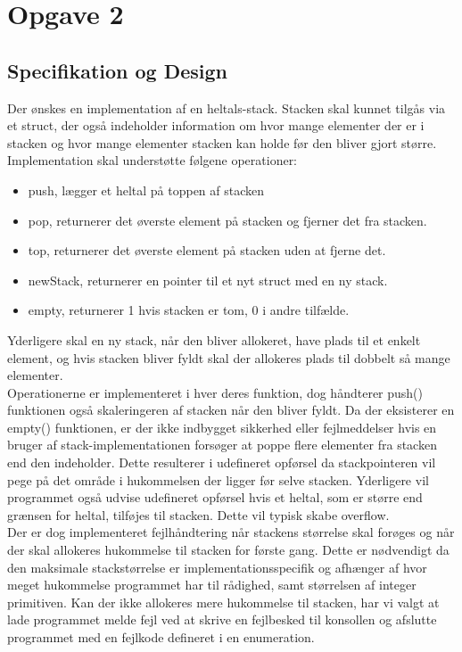 \section{Opgave 2}

\subsection{Specifikation og Design}
Der ønskes en implementation af en heltals-stack. Stacken skal kunnet tilgås via et struct, der også indeholder information om hvor mange elementer der er i stacken og hvor mange elementer stacken kan holde før den bliver gjort større. Implementation skal understøtte følgene operationer:

\begin{itemize}
\item push, lægger et heltal på toppen af stacken
\item pop, returnerer det øverste element på stacken og fjerner det fra stacken.
\item top, returnerer det øverste element på stacken uden at fjerne det.
\item newStack, returnerer en pointer til et nyt struct med en ny stack.
\item empty, returnerer 1 hvis stacken er tom, 0 i andre tilfælde.
\end{itemize}

Yderligere skal en ny stack, når den bliver allokeret, have plads til et enkelt element, og hvis stacken bliver fyldt skal der allokeres plads til dobbelt så mange elementer. \\

Operationerne er implementeret i hver deres funktion, dog håndterer push() funktionen også skaleringeren af stacken når den bliver fyldt. Da der eksisterer en empty() funktionen, er der ikke indbygget sikkerhed eller fejlmeddelser hvis en bruger af stack-implementationen forsøger at poppe flere elementer fra stacken end den indeholder. Dette resulterer i udefineret opførsel da stackpointeren vil pege på det område i hukommelsen der ligger før selve stacken. Yderligere vil programmet også udvise udefineret opførsel hvis et heltal, som er større end grænsen for heltal, tilføjes til stacken. Dette vil typisk skabe overflow.\\

Der er dog implementeret fejlhåndtering når stackens størrelse skal forøges og når der skal allokeres hukommelse til stacken for første gang. Dette er nødvendigt da den maksimale stackstørrelse er implementationsspecifik og afhænger af hvor meget hukommelse programmet har til rådighed, samt størrelsen af integer primitiven. Kan der ikke allokeres mere hukommelse til stacken, har vi valgt at lade programmet melde fejl ved at skrive en fejlbesked til konsollen og afslutte programmet med en fejlkode defineret i en enumeration. 

